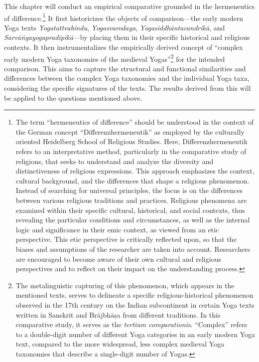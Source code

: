 This chapter will conduct an empirical comparative grounded in the hermeneutics of difference.\footnote{The term ``hermeneutics of difference'' should be understood in the context of the German concept ``Differenzhermeneutik'' as employed by the culturally oriented Heidelberg School of Religious Studies. Here, Differenzhermeneutik refers to an interpretative method, particularly in the comparative study of religions, that seeks to understand and analyze the diversity and distinctiveness of religious expressions. This approach emphasizes the context, cultural background, and the differences that shape a religious phenomenon. Instead of searching for universal principles, the focus is on the differences between various religious traditions and practices. Religious phenomena are examined within their specific cultural, historical, and social contexts, thus revealing the particular conditions and circumstances, as well as the internal logic and significance in their emic context, as viewed from an etic perspective. This etic perspective is critically reflected upon, so that the biases and assumptions of the researcher are taken into account. Researchers are encouraged to become aware of their own cultural and religious perspectives and to reflect on their impact on the understanding process.} It first historicizes the objects of comparison—the early modern Yoga texts \emph{Yogatattvabindu}, \emph{Yogasvarodaya}, \emph{Yogasiddhāntacandrikā}, and \emph{Sarvāṅgayogapradīpikā}—by placing them in their specific historical and religious contexts. It then instrumentalizes the empirically derived concept of ``complex early modern Yoga taxonomies of the medieval Yogas''\footnote{The metalinguistic capturing of this phenomenon, which appears in the mentioned texts, serves to delineate a specific religious-historical phenomenon observed in the 17th century on the Indian subcontinent in certain Yoga texts written in Sanskrit and Brājbhāṣa from different traditions. In this comparative study, it serves as the \textit{tertium comparationis}. ``Complex'' refers to a double-digit number of different Yoga categories in an early modern Yoga text, compared to the more widespread, less complex medieval Yoga taxonomies that describe a single-digit number of Yogas.} for the intended comparison. This aims to capture the structural and functional similarities and differences between the complex Yoga taxonomies and the individual Yoga taxa, considering the specific signatures of the texts. The results derived from this will be applied to the questions mentioned above.

